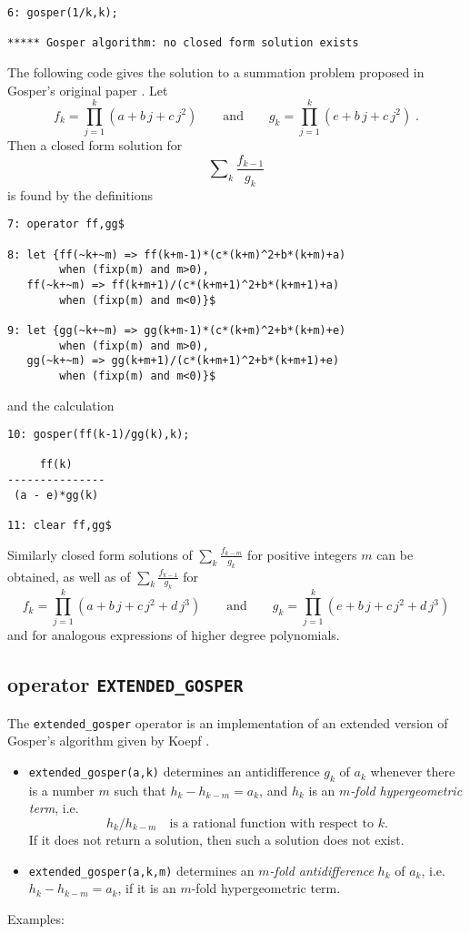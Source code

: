 {\small
\begin{verbatim}
6: gosper(1/k,k);

***** Gosper algorithm: no closed form solution exists
\end{verbatim}
}\noindent
The following code gives the solution to a summation problem proposed in
Gosper's original paper \cite{Gosper:78}. Let
\[
f_k=\prod_{j=1}^k (a+b\,j+c\,j^2)
\quad\quad\mbox{and}\quad\quad
g_k=\prod_{j=1}^k (e+b\,j+c\,j^2)
\;.
\]
Then a closed form solution for
\[
\sum\nolimits_k\frac{f_{k-1}}{g_{k}}
\]
is found by the definitions

{\small
\begin{verbatim}
7: operator ff,gg$

8: let {ff(~k+~m) => ff(k+m-1)*(c*(k+m)^2+b*(k+m)+a)
        when (fixp(m) and m>0),
   ff(~k+~m) => ff(k+m+1)/(c*(k+m+1)^2+b*(k+m+1)+a)
        when (fixp(m) and m<0)}$

9: let {gg(~k+~m) => gg(k+m-1)*(c*(k+m)^2+b*(k+m)+e)
        when (fixp(m) and m>0),
   gg(~k+~m) => gg(k+m+1)/(c*(k+m+1)^2+b*(k+m+1)+e)
        when (fixp(m) and m<0)}$
\end{verbatim}
}\noindent
and the calculation

{\small
\begin{verbatim}
10: gosper(ff(k-1)/gg(k),k);

     ff(k)
---------------
 (a - e)*gg(k)

11: clear ff,gg$
\end{verbatim}
}\noindent
Similarly closed form solutions of $\sum\nolimits_k\frac{f_{k-m}}{g_{k}}$
for positive integers $m$ can be obtained, as well as of
$\sum_k\frac{f_{k-1}}{g_{k}}$ for
\[
f_k=\prod_{j=1}^k (a+b\,j+c\,j^2+d\,j^3)
\quad\quad\mbox{and}\quad\quad
g_k=\prod_{j=1}^k (e+b\,j+c\,j^2+d\,j^3)
\]
and for analogous expressions of higher degree polynomials.

\subsection{\REDUCE{} operator \texttt{EXTENDED\_GOSPER}}
\hypertarget{operator:EXTENDED_GOSPER}{}
The \texttt{extended\_gosper} operator is an implementation of an extended
version of Gosper's algorithm given by Koepf \cite{Koepf:94b}.
\begin{itemize}
\item
\texttt{extended\_gosper(a,k)} determines an antidifference $g_k$ of $a_k$
whenever there is a number $m$ such that $h_{k}-h_{k-m}=a_k$, and $h_k$ is an
\textsl{$m$-fold hypergeometric term}, i.e.
\[
h_{k}/h_{k-m}\quad\mbox{is a rational function with respect to $k$.}
\]
If it does not return a solution, then such a solution does not exist.
\item
\texttt{extended\_gosper(a,k,m)}
determines an \textsl{$m$-fold antidifference} $h_k$ of $a_k$,
i.e.\ $h_{k}-h_{k-m}=a_k$, if it is an $m$-fold hypergeometric term.
\end{itemize}
Examples:

